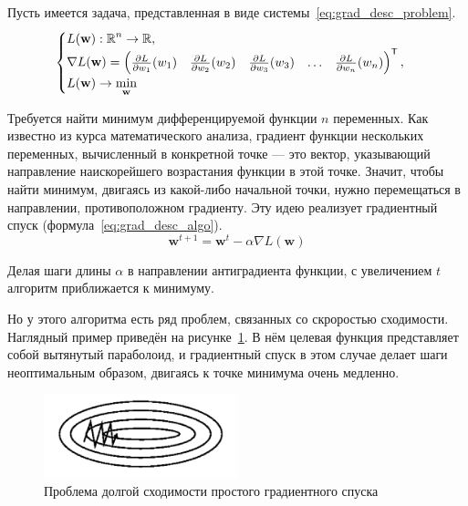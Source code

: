 Пусть имеется задача, представленная в виде системы \ref*{eq:grad_desc_problem}.
\begin{equation}
    \label{eq:grad_desc_problem}
    \begin{cases}
        L(\mathbf{w}): \operatorname{\mathbb{R}}^n \rightarrow \operatorname{\mathbb{R}}, \\
        \nabla L(\mathbf{w}) = \left(\begin{matrix}
            \frac{\partial L}{\partial w_1}(w_1) &
            \frac{\partial L}{\partial w_2}(w_2) &
            \frac{\partial L}{\partial w_3}(w_3) &
            \hdots &
            \frac{\partial L}{\partial w_n}(w_n)
        \end{matrix}\right)^\mathsf{T}, \\
        L(\mathbf{w}) \rightarrow \min\limits_\mathbf{w}
    \end{cases}
\end{equation}

Требуется найти минимум дифференцируемой функции $n$ переменных. Как известно из курса математического анализа, градиент функции нескольких переменных, вычисленный в конкретной точке --- это вектор, указывающий направление наискорейшего возрастания функции в этой точке. Значит, чтобы найти минимум, двигаясь из какой-либо начальной точки, нужно перемещаться в направлении, противоположном градиенту. Эту идею реализует градиентный спуск (формула \ref*{eq:grad_desc_algo}).
\begin{equation}
    \label{eq:grad_desc_algo}
    \mathbf{w}^{t+1}=\mathbf{w}^t-\alpha\nabla L(\mathbf{w})
\end{equation}

Делая шаги длины $\alpha$ в направлении антиградиента функции, с увеличением $t$ алгоритм приближается к минимуму.

Но у этого алгоритма есть ряд проблем, связанных со скроростью сходимости. Наглядный пример приведён на рисунке \ref*{fig:grad_desc_problem}. В нём целевая функция представляет собой вытянутый параболоид, и градиентный спуск в этом случае делает шаги неоптимальным образом, двигаясь к точке минимума очень медленно.

\begin{figure}[h]
    \centering
    \includegraphics[width=0.5\textwidth]{../inc/images/gradient_descend_problem.png}
    \caption{Проблема долгой сходимости простого градиентного спуска}
    \label{fig:grad_desc_problem}
\end{figure}

